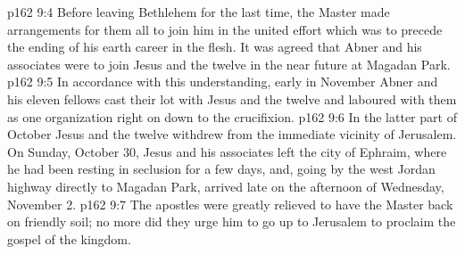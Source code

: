 \vs p162 9:4 \pc Before leaving Bethlehem for the last time, the Master made arrangements for them all to join him in the united effort which was to precede the ending of his earth career in the flesh. It was agreed that Abner and his associates were to join Jesus and the twelve in the near future at Magadan Park.
\vs p162 9:5 In accordance with this understanding, early in November Abner and his eleven fellows cast their lot with Jesus and the twelve and laboured with them as one organization right on down to the crucifixion.
\vs p162 9:6 In the latter part of October Jesus and the twelve withdrew from the immediate vicinity of Jerusalem. On Sunday, October 30, Jesus and his associates left the city of Ephraim, where he had been resting in seclusion for a few days, and, going by the west Jordan highway directly to Magadan Park, arrived late on the afternoon of Wednesday, November 2.
\vs p162 9:7 The apostles were greatly relieved to have the Master back on friendly soil; no more did they urge him to go up to Jerusalem to proclaim the gospel of the kingdom.
\quizlink
